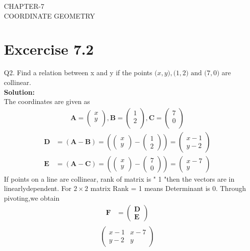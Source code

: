 \documentclass[12pt]{article}
\providecommand{\brak}[1]{\ensuremath{\left(#1\right)}}
\newcommand{\solution}{\noindent \textbf{Solution: }}
\newcommand{\myvec}[1]{\ensuremath{\begin{pmatrix}#1\end{pmatrix}}}
\let\vec\mathbf
\begin{document}
\begin{center}
\textbf\large{CHAPTER-7 \\ COORDINATE GEOMETRY}
\end{center}
\section*{Excercise 7.2}

Q2. Find a relation between x and y if the points $\vec(x, y), \vec(1, 2) \text{ and } \vec(7, 0)$ are collinear.
\\
\solution
\\
The coordinates are given as
	\begin{align}
	\vec{A} = \myvec{
		x\\
		y\\
		},
	\vec{B} = \myvec{
		1\\
		2\\
		},
	\vec{C} = \myvec{
		7\\
		0\\
		}
	\end{align}
	\begin{align}
\vec{D} &=\brak{\vec{A}-\vec{B}} = \brak{\myvec{x \\y } - \myvec{1 \\2 } } = \myvec{x-1 \\ y-2 }\\
\vec{E} &= \brak{\vec{A}-\vec{C}} = \brak{\myvec{x \\ y } - \myvec{7 \\0} } = \myvec{x-7 \\y}
\end{align}
 If points on a line  are  collinear, rank of matrix is " 1 "then the vectors are in linearlydependent.
For $2\times2$ matrix Rank = 1 means Determinant is 0.
Through pivoting,we obtain
\begin{align}
\vec{F} &={\myvec{\vec{D}\\ \vec{E}}}
\end{align}
\begin{align}
\begin{split}
\myvec{
x-1 & x-7
 \\
y-2 & y 
}
\end{split}
\end{align}
\end{document}
